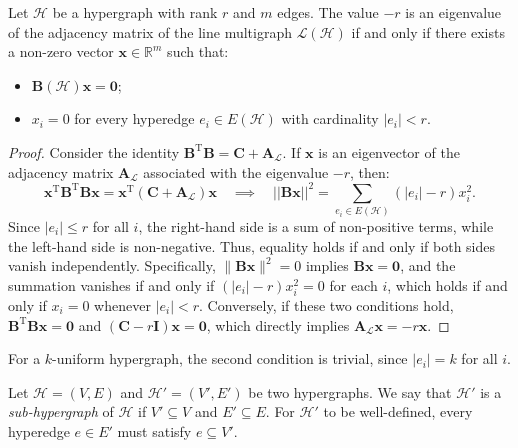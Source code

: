 \documentclass[12pt,reqno]{amsart}
\begin{document}
\begin{lemma}\label{lem:lk}
Let $\mathcal{H}$ be a hypergraph with rank $r$ and $m$ edges. The value $-r$ is an eigenvalue of the adjacency matrix of the line multigraph $\mathcal{L}(\mathcal{H})$ if and only if there exists a non-zero vector $\mathbf{x} \in \mathbb{R}^{m}$ such that:
\begin{itemize}
\item $\mathbf{B}(\mathcal{H})\mathbf{x} = \mathbf{0}$;

\item $x_i = 0$ for every hyperedge $e_i \in E(\mathcal{H})$ with cardinality $|e_i| < r$.
\end{itemize}
\end{lemma}
\begin{proof}
Consider the identity $\mathbf{B}^\mathrm{T}\mathbf{B} = \mathbf{C} + \mathbf{A}_{\mathcal{L}}$. If $\mathbf{x}$ is an eigenvector of the adjacency matrix $\mathbf{A}_{\mathcal{L}}$ associated with the eigenvalue $-r$, then:
\begin{equation*}
\mathbf{x}^\mathrm{T} \mathbf{B}^\mathrm{T} \mathbf{B} \mathbf{x} = \mathbf{x}^\mathrm{T}(\mathbf{C} + \mathbf{A}_{\mathcal{L}})\mathbf{x}\quad \implies\quad ||\mathbf{B}\mathbf{x}||^2 = \sum_{e_i \in E(\mathcal{H})} (|e_i| - r)x_i^2.
\end{equation*}
Since $|e_i| \leq r$ for all $i$, the right-hand side is a sum of non-positive terms, while the left-hand side is non-negative. Thus, equality holds if and only if both sides vanish independently. Specifically, $\|\mathbf{B}\mathbf{x}\|^2 = 0$ implies $\mathbf{B}\mathbf{x} = \mathbf{0}$, and the summation vanishes if and only if $(|e_i| - r)x_i^2 = 0$ for each $i$, which holds if and only if $x_i = 0$ whenever $|e_i| < r$. Conversely, if these two conditions hold, $\mathbf{B}^\mathrm{T}\mathbf{B}\mathbf{x} = \mathbf{0}$ and $(\mathbf{C} - r\mathbf{I})\mathbf{x} = \mathbf{0}$, which directly implies $\mathbf{A}_{\mathcal{L}}\mathbf{x} = -r\mathbf{x}$.
\end{proof}
\begin{remark} 
For a $k$-uniform hypergraph, the second condition is trivial, since $|e_i| = k$ for all $i$.
\end{remark}

\begin{definition}\label{def:subhypergraph}
Let $\mathcal{H} = (V, E)$ and $\mathcal{H}' = (V', E')$ be two hypergraphs. We say that $\mathcal{H}'$ is a \textit{sub-hypergraph} of $\mathcal{H}$ if $V' \subseteq V$ and $E' \subseteq E$. For $\mathcal{H}'$ to be well-defined, every hyperedge $e \in E'$ must satisfy $e \subseteq V'$.
\end{definition}
\end{document}
